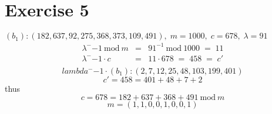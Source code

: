 \documentclass[a4paper]{scrreprt}
\renewcommand\mod{\ \mathrm{mod}\:}
\begin{document}
\section*{Exercise 5}

$(b_1): (182,637,92,275,368,373,109,491),\;m=1000,\;c=678,\;\lambda=91$
\begin{eqnarray*}
    \lambda^-{-1}\mod m &=& 91^{-1}\mod 1000\;=\;11\\
    \lambda^-{-1}\cdot c &=& 11\cdot678\;=\;458\;=\;c'\\
\end{eqnarray*}
\[lambda^-{-1}\cdot(b_1) : (2,7,12,25,48,103,199,401)\]
\[c'=458=401+48+7+2\] thus \[c=678=182+637+368+491\mod m\]
\[m=(1,1,0,0,1,0,0,1)\]
\end{document}
